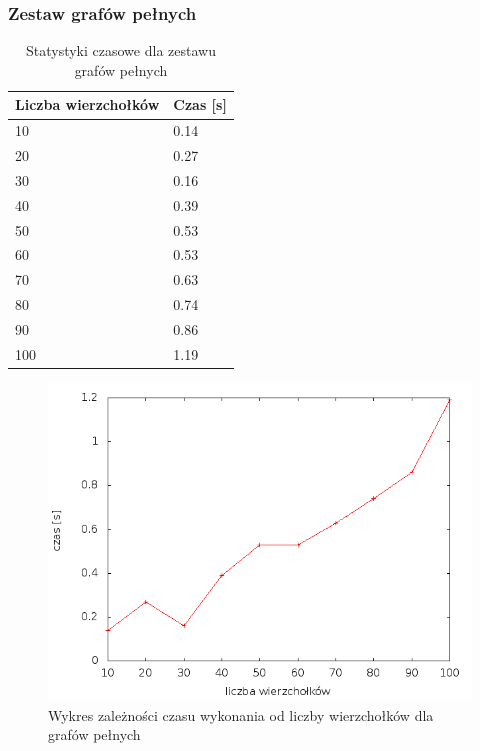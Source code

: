 \documentclass[12pt, a4paper]{article}
\begin{document}
\subsubsection*{Zestaw grafów pełnych}
\begin{table}[H]
\caption{Statystyki czasowe dla zestawu grafów pełnych}
\begin{center}
    \begin{tabular}{|l|l|}
    \hline
    Liczba wierzchołków & Czas [s] \\ \hline
    10 & 0.14 \\ \hline
    20 & 0.27 \\ \hline
    30 & 0.16 \\ \hline
    40 & 0.39 \\ \hline
    50 & 0.53 \\ \hline
    60 & 0.53 \\ \hline
    70 & 0.63 \\ \hline
    80 & 0.74 \\ \hline
    90 & 0.86 \\ \hline
    100 & 1.19 \\ \hline
    \end{tabular}
\end{center}
\end{table}

\begin{figure}[h]
    \begin{center}
	\includegraphics[scale=0.5]{results/img/den/den_1.png}
	\caption{Wykres zależności czasu wykonania od liczby wierzchołków dla grafów pełnych}
    \end{center}
\end{figure}
\newpage
\end{document}
